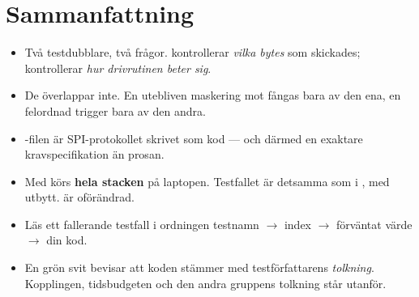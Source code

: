 \section*{Sammanfattning}

\begin{itemize}
  \item Två testdubblare, två frågor.  kontrollerar \emph{vilka bytes} som
    skickades;  kontrollerar \emph{hur drivrutinen beter sig}.
  \item De överlappar inte. En utebliven maskering mot  fångas bara av den ena, en
    felordnad trigger bara av den andra.
  \item {}-filen är SPI-protokollet skrivet som kod --- och därmed en
    exaktare kravspecifikation än prosan.
  \item Med  körs \textbf{hela stacken} på laptopen. Testfallet är detsamma
    som i , med  utbytt.  är oförändrad.
  \item Läs ett fallerande testfall i ordningen testnamn $\rightarrow$ index $\rightarrow$
    förväntat värde $\rightarrow$ din kod.
  \item En grön svit bevisar att koden stämmer med testförfattarens \emph{tolkning}. Kopplingen,
    tidsbudgeten och den andra gruppens tolkning står utanför.
\end{itemize}
